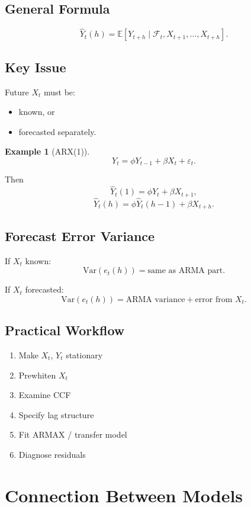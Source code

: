 \documentclass[12pt,oneside]{book}
\numberwithin{equation}{section}
\theoremstyle{definition}
\newtheorem{example}{Example}[section]
\theoremstyle{plain}
\theoremstyle{remark}
\newcommand{\E}{\mathbb{E}}
\newcommand{\Var}{\mathrm{Var}}
\begin{document}
\subsection{General Formula}

\[
\widehat{Y}_t(h)
=
\E[Y_{t+h} \mid \mathcal{F}_t, X_{t+1},\ldots,X_{t+h}].
\]

\subsection{Key Issue}

Future $X_t$ must be:
\begin{itemize}
\item known, or
\item forecasted separately.
\end{itemize}

\begin{example}[ARX(1)]
\[
Y_t = \phi Y_{t-1} + \beta X_t + \varepsilon_t.
\]

Then
\[
\widehat{Y}_t(1) = \phi Y_t + \beta X_{t+1},
\]
\[
\widehat{Y}_t(h) = \phi \widehat{Y}_t(h-1) + \beta X_{t+h}.
\]
\end{example}

\subsection{Forecast Error Variance}

If $X_t$ known:
\[
\Var(e_t(h)) = \text{same as ARMA part}.
\]

If $X_t$ forecasted:
\[
\Var(e_t(h)) = \text{ARMA variance} + \text{error from } X_t.
\]

\subsection{Practical Workflow}

\begin{enumerate}
\item Make $X_t$, $Y_t$ stationary
\item Prewhiten $X_t$
\item Examine CCF
\item Specify lag structure
\item Fit ARMAX / transfer model
\item Diagnose residuals
\end{enumerate}

\section{Connection Between Models}
\end{document}
